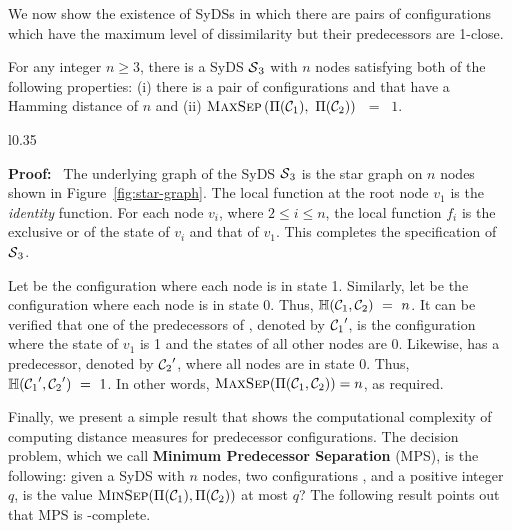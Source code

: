 \smallskip

We now show the existence of SyDSs in which there 
are pairs of configurations which have the maximum level 
of dissimilarity but their predecessors are 1-close. 

\begin{proposition}\label{pro:far-close}
For any integer $n \geq 3$,
there is a SyDS $\mbox{$\mathcal{S}$}_3${} with $n$
nodes satisfying both of the following properties: 
(i) there is a pair of configurations
\calcone{} and \calctwo{} that have a Hamming distance of $n$  and 
(ii) $\mbox{\textsc{MaxSep}}\left( \mbox{$\Pi(\mbox{$\mathcal{C}_{1}$})$},~ \mbox{$\Pi(\mbox{$\mathcal{C}_{2}$})$} \right)$ ~=~ $1$.
\end{proposition}

\begin{wrapfigure}[11]{l}{0.35\textwidth}
\centering

\caption{\small{Star graph used in the proof of
Proposition~\ref{pro:far-close}.}}
\label{fig:star-graph}
\smallskip
\end{wrapfigure}
\noindent
\textbf{Proof:}~ The underlying graph of the SyDS $\mbox{$\mathcal{S}$}_3$ is
the star graph on $n$ nodes shown in Figure~\ref{fig:star-graph}.
The local function at the root node $v_1$ is the \emph{identity}
function.
For each node $v_i$, where $2 \leq i \leq n$, the local function
$f_i$ is the exclusive or of the state of $v_i$ and that of $v_1$.  
This completes the specification of $\mbox{$\mathcal{S}$}_3$.

Let \calcone{} be the configuration where each node is in state 1.
Similarly, let \calctwo{} be the configuration where each node is in state 0.
Thus, $\mbox{$\mathbb{H}$}(\mbox{$\mathcal{C}_{1}$}, \mbox{$\mathcal{C}_{2}$}) ~=~ n$.
It can be verified that one of the predecessors of \calcone, 
denoted by $\mbox{$\mathcal{C}_{1}$}'$, is
the configuration where the state of $v_1$ is 1 and the states of all other
nodes are 0.
Likewise, \calctwo{} has a predecessor, denoted by $\mbox{$\mathcal{C}_{2}$}'$,
where all nodes are in state 0.
Thus, $\mbox{$\mathbb{H}$}(\mbox{$\mathcal{C}_{1}$}', \mbox{$\mathcal{C}_{2}$}') ~=~ 1$.
In other words, $\mbox{\textsc{MaxSep}}(\Pi(\mbox{$\mathcal{C}_{1}$}, \mbox{$\mathcal{C}_{2}$})) = n$, as required. \QED

\newcommand{\mps}{\mbox{MPS}}
\newcommand{\pre}{\mbox{PRE}}

\smallskip

Finally, we present a simple result that shows the computational complexity
of computing distance measures for predecessor configurations.
The decision problem, which we call \textbf{Minimum Predecessor Separation} (\mps),
is the following: given a SyDS \cals{} with $n$ nodes, two configurations \calcone,{}
\calctwo{} and a positive integer $q$, is the value 
$\mbox{\textsc{MinSep}}(\Pi(\mbox{$\mathcal{C}_{1}$}), \Pi(\mbox{$\mathcal{C}_{2}$}))$ at most $q$?
The following result points out that \mps{} is \cnp-complete.

